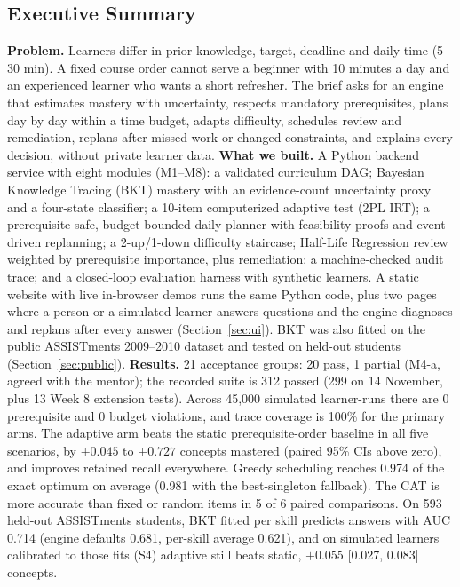 \documentclass[english]{sintr}
\begin{document}
\subsection*{Executive Summary}
\textbf{Problem.} Learners differ in prior knowledge, target, deadline and daily time (5--30 min). A fixed course order cannot serve a beginner with 10 minutes a day and an experienced learner who wants a short refresher. The brief asks for an engine that estimates mastery with uncertainty, respects mandatory prerequisites, plans day by day within a time budget, adapts difficulty, schedules review and remediation, replans after missed work or changed constraints, and explains every decision, without private learner data.
\vspace{0.2em}\newline
\textbf{What we built.} A Python backend service with eight modules (M1--M8): a validated curriculum DAG; Bayesian Knowledge Tracing (BKT) mastery with an evidence-count uncertainty proxy and a four-state classifier; a 10-item computerized adaptive test (2PL IRT); a prerequisite-safe, budget-bounded daily planner with feasibility proofs and event-driven replanning; a 2-up/1-down difficulty staircase; Half-Life Regression review weighted by prerequisite importance, plus remediation; a machine-checked audit trace; and a closed-loop evaluation harness with synthetic learners. A static website with live in-browser demos runs the same Python code, plus two pages where a person or a simulated learner answers questions and the engine diagnoses and replans after every answer (Section~\ref{sec:ui}). BKT was also fitted on the public ASSISTments 2009--2010 dataset and tested on held-out students (Section~\ref{sec:public}).
\vspace{0.2em}\newline
\textbf{Results.} 21 acceptance groups: 20 pass, 1 partial (M4-a, agreed with the mentor); the recorded suite is 312 passed (299 on 14 November, plus 13 Week 8 extension tests). Across 45,000 simulated learner-runs there are 0 prerequisite and 0 budget violations, and trace coverage is 100\% for the primary arms. The adaptive arm beats the static prerequisite-order baseline in all five scenarios, by $+0.045$ to $+0.727$ concepts mastered (paired 95\% CIs above zero), and improves retained recall everywhere. Greedy scheduling reaches 0.974 of the exact optimum on average (0.981 with the best-singleton fallback). The CAT is more accurate than fixed or random items in 5 of 6 paired comparisons. On 593 held-out ASSISTments students, BKT fitted per skill predicts answers with AUC 0.714 (engine defaults 0.681, per-skill average 0.621), and on simulated learners calibrated to those fits (S4) adaptive still beats static, $+0.055$ [0.027, 0.083] concepts.
\end{document}
